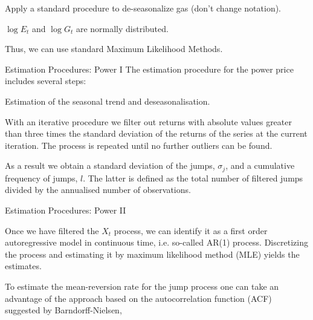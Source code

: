 	Apply a standard procedure to de-seasonalize gas (don't change notation).


	$\log E_t$ and $\log G_t$ are normally distributed.


	Thus, we can use standard Maximum Likelihood Methods.





{Estimation Procedures: Power I}
The estimation procedure for the power price includes several steps:






	Estimation of the seasonal trend and deseasonalisation.


	With an iterative procedure we filter out returns with absolute values greater than three times the standard deviation of the returns of the series at the current iteration. The process is repeated until no further outliers can be found.


	As a result we obtain a standard deviation of the jumps, $\sigma_j$, and a cumulative frequency of jumps, $l$. The latter is defined as the total number of filtered jumps divided by the annualised number of observations.





{Estimation Procedures: Power II}






	Once we have filtered the $X_t$ process, we can identify it as a first order autoregressive model in continuous time, i.e. so-called AR(1) process. Discretizing the process and estimating it by maximum likelihood method (MLE) yields the estimates.
%

	To estimate the mean-reversion rate for the jump process one can take an advantage of the approach based on the autocorrelation function (ACF) suggested by Barndorff-Nielsen, %





